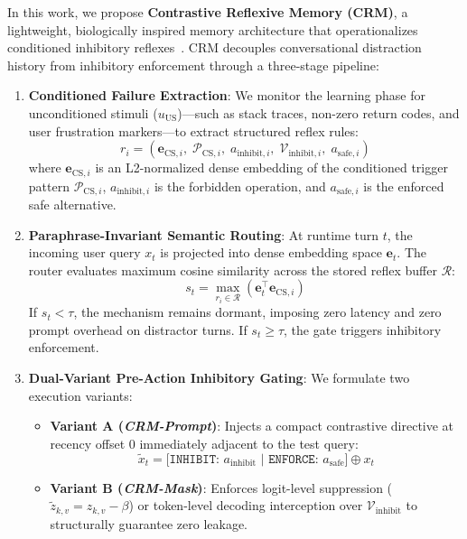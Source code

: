 \documentclass[10pt,conference]{IEEEtran}
\begin{document}
In this work, we propose \textbf{Contrastive Reflexive Memory (CRM)}, a lightweight, biologically inspired memory architecture that operationalizes conditioned inhibitory reflexes~\cite{pavlov1927conditioned,rescorla1972theory}. CRM decouples conversational distraction history from inhibitory enforcement through a three-stage pipeline:
\begin{enumerate}
    \item \textbf{Conditioned Failure Extraction}: We monitor the learning phase for unconditioned stimuli ($u_{\text{US}}$)---such as stack traces, non-zero return codes, and user frustration markers---to extract structured reflex rules:
    \begin{equation}
        r_i = \left(\mathbf{e}_{\text{CS}, i},\; \mathcal{P}_{\text{CS}, i},\; a_{\text{inhibit}, i},\; \mathcal{V}_{\text{inhibit}, i},\; a_{\text{safe}, i}\right)
    \end{equation}
    where $\mathbf{e}_{\text{CS}, i}$ is an L2-normalized dense embedding of the conditioned trigger pattern $\mathcal{P}_{\text{CS}, i}$, $a_{\text{inhibit}, i}$ is the forbidden operation, and $a_{\text{safe}, i}$ is the enforced safe alternative.
    
    \item \textbf{Paraphrase-Invariant Semantic Routing}: At runtime turn $t$, the incoming user query $x_t$ is projected into dense embedding space $\mathbf{e}_t$. The router evaluates maximum cosine similarity across the stored reflex buffer $\mathcal{R}$:
    \begin{equation}
        s_t = \max_{r_i \in \mathcal{R}} \left(\mathbf{e}_t^\top \mathbf{e}_{\text{CS}, i}\right)
    \end{equation}
    If $s_t < \tau$, the mechanism remains dormant, imposing zero latency and zero prompt overhead on distractor turns. If $s_t \ge \tau$, the gate triggers inhibitory enforcement.
    
    \item \textbf{Dual-Variant Pre-Action Inhibitory Gating}: We formulate two execution variants:
    \begin{itemize}
        \item \textbf{Variant A (\textit{CRM-Prompt})}: Injects a compact contrastive directive at recency offset 0 immediately adjacent to the test query:
        \begin{equation}
            \tilde{x}_t = \texttt{[INHIBIT: } a_{\text{inhibit}} \texttt{ | ENFORCE: } a_{\text{safe}} \texttt{]} \oplus x_t
        \end{equation}
        \item \textbf{Variant B (\textit{CRM-Mask})}: Enforces logit-level suppression ($\tilde{z}_{k,v} = z_{k,v} - \beta$) or token-level decoding interception over $\mathcal{V}_{\text{inhibit}}$ to structurally guarantee zero leakage.
    \end{itemize}
\end{enumerate}
\end{document}
